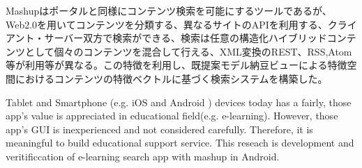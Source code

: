 
\begin{jabstract}
Mashupはポータルと同様にコンテンツ検索を可能にするツールであるが、Web2.0を用いてコンテンツを分類する、異なるサイトのAPIを利用する、クライアント・サーバー双方で検索ができる、検索は任意の構造化ハイブリッドコンテンツとして個々のコンテンツを混合して行える、XML変換のREST、RSS,Atom等が利用等が異なる。この特徴を利用し、既提案モデル納豆ビューによる特徴空間におけるコンテンツの特徴ベクトルに基づく検索システムを構築した。
\end{jabstract}

\begin{eabstract}
Tablet and Smartphone (e.g. iOS and Android ) devices today has a fairly, those app's value is appreciated in educational field(e.g. e-learning). However, those app's GUI is inexperienced and not considered carefully. Therefore, it is meaningful to build educational support service. This reseach is development and veritificcation of e-learning search app with mashup in Android.
\end{eabstract}